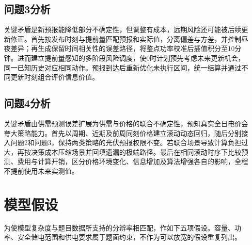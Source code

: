 \documentclass[withoutpreface,bwprint]{cumcmthesis}
\begin{document}
\subsection*{问题3分析}
关键矛盾是新预报能降低部分不确定性，但调整有成本，远期风险还可能被后续更新修正。首先按发布时刻与提前量匹配预报和实际值，分离偏差与方差，并控制昼夜差异；再生成保留时间相关性的误差路径，将整点功率校准后插值积分至10分钟。进而建立提前量感知的多阶段风险调度，使0时计划预先考虑未来更新机会，同一已知历史对应相同动作。预报到达后重新优化未执行区间，统一结算并通过不同更新时刻组合评价信息价值。

\subsection*{问题4分析}
关键矛盾由供需预测误差扩展为供需与价格的联合不确定性，预知真实全日电价会夸大策略能力。首先以周期、近期及前周同刻价格建立滚动动态回归，随后分别接入问题2和问题3，保持两类策略的光伏预报权限不变。若联合场景导致计算负担过大，再按决策成本压缩场景并回填遗漏的极端路径。最后在相同滚动时序下比较预测、费用与计算开销，区分价格环境变化、信息增加及算法增强各自的影响，全程不提前使用未来实测值。

\clearpage
\section{模型假设}
为使模型复杂度与题目数据所支持的分辨率相匹配，作如下五项假设。容量、功率、安全储电范围和供电要求属于题面约束，不作为可以放宽的假设重复列出。
\end{document}
